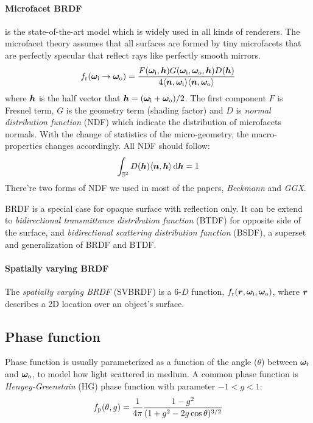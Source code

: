 \paragraph{Microfacet BRDF} is the state-of-the-art model which is widely used in all kinds of renderers. The microfacet theory assumes that all surfaces are formed by tiny microfacets that are perfectly specular that reflect rays like perfectly smooth mirrors.
\begin{equation}
	f_\mathrm{r}(\bm\omega_\mathrm{i}\rightarrow\bm\omega_\mathrm{o}) = 
	\frac{F(\bm\omega_\mathrm{i}, \bm{h}) G(\bm\omega_\mathrm{i},\bm\omega_\mathrm{o},\bm{h}) D(\bm{h})}
	{4{\langle \bm{n},\bm\omega_\mathrm{i} \rangle}{\langle \bm{n},\bm\omega_\mathrm{o} \rangle}}
\end{equation}
where $\bm{h}$ is the half vector that $\bm{h}=(\bm\omega_\mathrm{i}+\bm\omega_\mathrm{o})/2$. The first component $F$ is Fresnel term, $G$ is the geometry term (shading factor) and $D$ is \emph{normal distribution function} (NDF) which indicate the distribution of microfacets normals. With the change of statistics of the micro-geometry, the macro-properties changes accordingly.
All NDF should follow:
\begin{equation}
	\int_{\mathbb{S}^2} D(\bm{h}){\langle \bm{n},\bm{h} \rangle} \,\mathrm{d}\bm{h} = 1
\end{equation}
There're two forms of NDF we used in most of the papers, \emph{Beckmann} and \emph{GGX}.

BRDF is a special case for opaque surface with reflection only. It can be extend to \emph{bidirectional transmittance distribution function} (BTDF) for  opposite side of the surface, and \emph{bidirectional scattering distribution function} (BSDF), a superset and generalization of BRDF and BTDF.

%


\paragraph{Spatially varying BRDF}
The \emph{spatially varying BRDF} (SVBRDF) is a 6-$D$ function, $f_\mathrm{r}(\bm{r},\bm\omega_\mathrm{i},\bm\omega_\mathrm{o})$, where $\bm{r}$ describes a 2D location over an object's surface.


\subsection{Phase function}
Phase function is usually parameterized as a function of the angle ($\theta$) between $\bm\omega_\mathrm{i}$ and $\bm\omega_\mathrm{o}$, to model how light scattered in medium. A common phase function is \emph{Henyey-Greenstain} (HG) phase function with parameter $-1<g<1$:
\begin{equation}
	f_\mathrm{p}(\theta,g) = \frac{1}{4\pi}
	\frac{1-g^2}
	{(1+g^2-2g\cos\theta)^{3/2}}
\end{equation}


